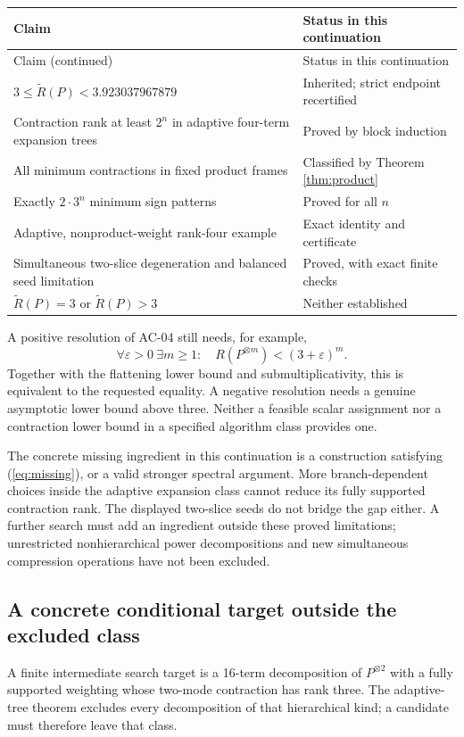 \documentclass[11pt,letterpaper]{article}
\theoremstyle{definition}\newtheorem{definition}[theorem]{Definition}
\theoremstyle{remark}\newtheorem{remark}[theorem]{Remark}
\newcommand{\AR}{\widetilde R}
\begin{document}
\begin{longtable}{p{}p{}}
\toprule
Claim & Status in this continuation\\\midrule
\endfirsthead
\toprule
Claim (continued) & Status in this continuation\\\midrule
\endhead
$3\leq\AR(P)<3.923037967879$ & Inherited; strict endpoint recertified\\
Contraction rank at least $2^n$ in adaptive four-term expansion trees & Proved by block induction\\
All minimum contractions in fixed product frames & Classified by Theorem \ref{thm:product}\\
Exactly $2\cdot3^n$ minimum sign patterns & Proved for all $n$\\
Adaptive, nonproduct-weight rank-four example & Exact identity and certificate\\
Simultaneous two-slice degeneration and balanced seed limitation & Proved, with exact finite checks\\
$\AR(P)=3$ or $\AR(P)>3$ & Neither established\\\bottomrule
\end{longtable}

A positive resolution of AC-04 still needs, for example,
\begin{equation}\label{eq:missing}
\forall\varepsilon>0\ \exists m\geq1:\quad
R(P^{\otimes m})<(3+\varepsilon)^m.
\end{equation}
Together with the flattening lower bound and submultiplicativity, this is equivalent to the requested equality. A negative resolution needs a genuine asymptotic lower bound above three. Neither a feasible scalar assignment nor a contraction lower bound in a specified algorithm class provides one.

The concrete missing ingredient in this continuation is a construction satisfying (\ref{eq:missing}), or a valid stronger spectral argument. More branch-dependent choices inside the adaptive expansion class cannot reduce its fully supported contraction rank. The displayed two-slice seeds do not bridge the gap either. A further search must add an ingredient outside these proved limitations; unrestricted nonhierarchical power decompositions and new simultaneous compression operations have not been excluded.

\subsection*{A concrete conditional target outside the excluded class}
A finite intermediate search target is a 16-term decomposition of $P^{\otimes2}$ with a fully supported weighting whose two-mode contraction has rank three. The adaptive-tree theorem excludes every decomposition of that hierarchical kind; a candidate must therefore leave that class.
\end{document}
